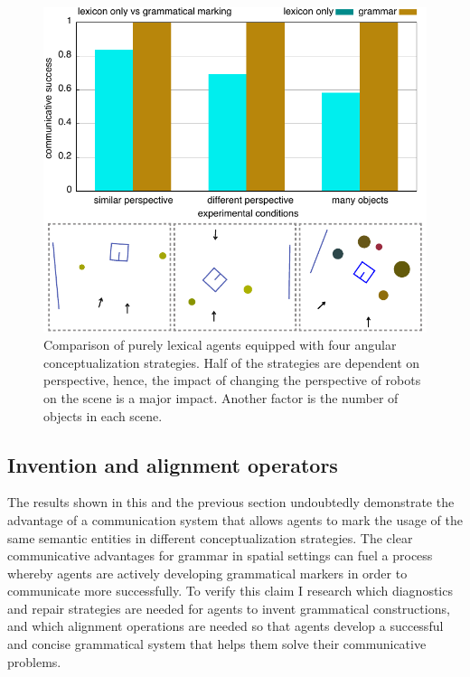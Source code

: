 \begin{figure}
\includegraphics[width=1.0\columnwidth]{figs/why-grammar}
\caption[Comparison lexical versus grammatical agents]{%
Comparison of purely lexical agents equipped with four angular 
conceptualization strategies. Half of the strategies are dependent on 
perspective, hence, the impact of changing the perspective of robots on the scene
is a major impact. Another factor is the number of objects in each scene.}
\label{f:why-grammar}
\end{figure}

\subsection{Invention and alignment operators}
The results shown in this and the previous section undoubtedly demonstrate
the advantage of a communication system that allows agents to mark the usage 
of the same semantic entities in different conceptualization strategies. The clear 
communicative advantages for grammar in spatial settings can fuel a process whereby 
agents are actively developing grammatical markers in order to communicate more 
successfully. To verify this claim I research which diagnostics and repair 
strategies are needed for agents to invent grammatical constructions, and which 
alignment operations are needed so that agents develop a successful and concise 
grammatical system that helps them solve their communicative problems.

